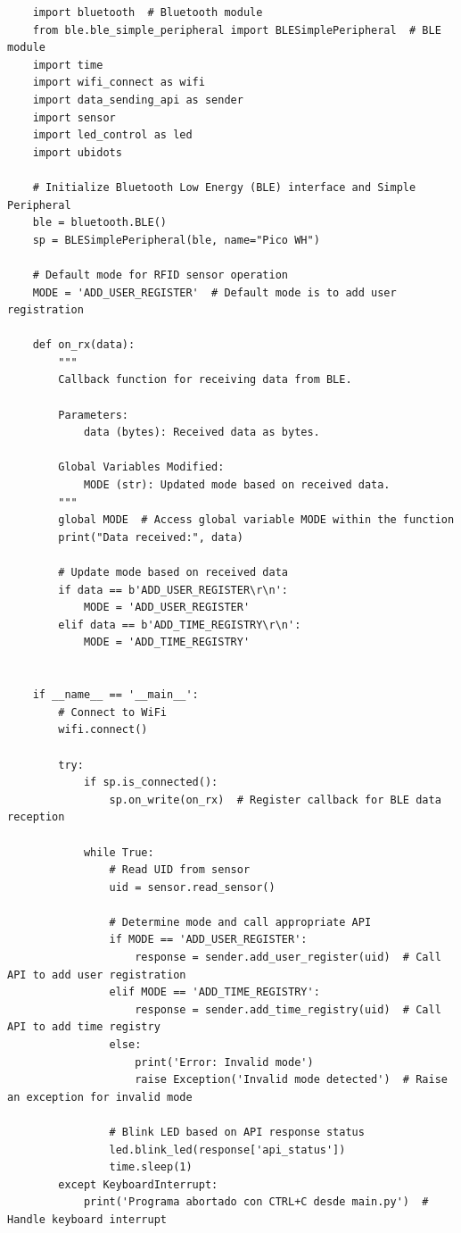 \documentclass{article}
\begin{document}
\begin{lstlisting}
	import bluetooth  # Bluetooth module
	from ble.ble_simple_peripheral import BLESimplePeripheral  # BLE module
	import time
	import wifi_connect as wifi
	import data_sending_api as sender
	import sensor
	import led_control as led
	import ubidots
	
	# Initialize Bluetooth Low Energy (BLE) interface and Simple Peripheral
	ble = bluetooth.BLE()
	sp = BLESimplePeripheral(ble, name="Pico WH")
	
	# Default mode for RFID sensor operation
	MODE = 'ADD_USER_REGISTER'  # Default mode is to add user registration
	
	def on_rx(data):
		"""
		Callback function for receiving data from BLE.
	
		Parameters:
			data (bytes): Received data as bytes.
	
		Global Variables Modified:
			MODE (str): Updated mode based on received data.
		"""
		global MODE  # Access global variable MODE within the function
		print("Data received:", data)
	
		# Update mode based on received data
		if data == b'ADD_USER_REGISTER\r\n':
			MODE = 'ADD_USER_REGISTER'
		elif data == b'ADD_TIME_REGISTRY\r\n':
			MODE = 'ADD_TIME_REGISTRY'
	
	
	if __name__ == '__main__':
		# Connect to WiFi
		wifi.connect()
	
		try:
			if sp.is_connected():
				sp.on_write(on_rx)  # Register callback for BLE data reception
				
			while True:
				# Read UID from sensor
				uid = sensor.read_sensor()
				
				# Determine mode and call appropriate API
				if MODE == 'ADD_USER_REGISTER':
					response = sender.add_user_register(uid)  # Call API to add user registration
				elif MODE == 'ADD_TIME_REGISTRY':
					response = sender.add_time_registry(uid)  # Call API to add time registry
				else:
					print('Error: Invalid mode')
					raise Exception('Invalid mode detected')  # Raise an exception for invalid mode
				
				# Blink LED based on API response status
				led.blink_led(response['api_status'])
				time.sleep(1)
		except KeyboardInterrupt:
			print('Programa abortado con CTRL+C desde main.py')  # Handle keyboard interrupt
	\end{lstlisting}
	
\end{document}
